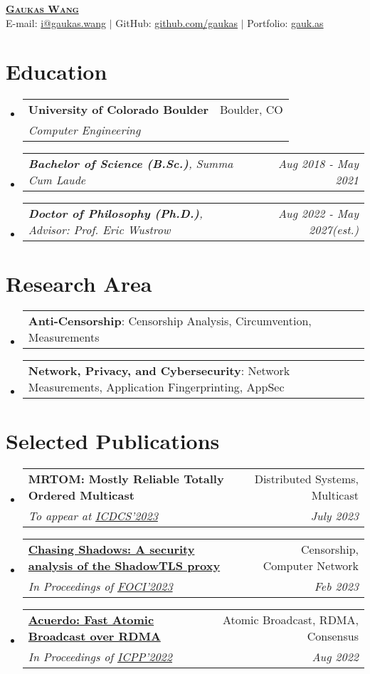 \documentclass[letterpaper,11pt]{article}
\makeatletter
\newcommand{\resumeSubheading}[4]{
  \vspace{-2pt}\item
    \begin{tabular*}{0.97\textwidth}[t]{l@{\extracolsep{\fill}}r}
      \textbf{#1} & #2 \\
      \textit{\small#3} & \textit{\small #4} \\
    \end{tabular*}\vspace{-7pt}
}
\newcommand{\resumeSubSubheading}[2]{
    \item
    \begin{tabular*}{0.97\textwidth}{l@{\extracolsep{\fill}}r}
      \textit{\small#1} & \textit{\small #2} \\
    \end{tabular*}\vspace{-7pt}
}
\newcommand{\resumeProjectHeading}[2]{
    \item
    \begin{tabular*}{0.97\textwidth}{l@{\extracolsep{\fill}}r}
      \small#1 & #2 \\
    \end{tabular*}\vspace{-7pt}
}
\newcommand{\resumeSubHeadingListStart}{\begin{itemize}[leftmargin=0.15in, label={}]}
\newcommand{\resumeSubHeadingListEnd}{\end{itemize}}
\makeatother
\begin{document}
\begin{center}
  \href{https://gaukas.wang}{\textbf{\Huge \scshape Gaukas Wang}} \\ \vspace{1pt}
    E-mail: \href{mailto:i@gaukas.wang}{{i@gaukas.wang}} $|$ 
    GitHub: \href{https://github.com/gaukas}{{github.com/gaukas}} $|$ 
    Portfolio: \href{https://gauk.as}{gauk.as}
\end{center}


\section{Education}
\resumeSubHeadingListStart
\resumeSubheading
{University of Colorado Boulder}{Boulder, CO}
{Computer Engineering}{}
\resumeSubSubheading
{\textbf{Bachelor of Science (B.Sc.)}, \em{Summa Cum Laude}}{Aug 2018 - May 2021}
\resumeSubSubheading
{\textbf{Doctor of Philosophy (Ph.D.)}, \em{Advisor: Prof. Eric Wustrow}}{Aug 2022 - May 2027\textit{(est.)}}
\resumeSubHeadingListEnd

\vspace{1pt}

\section{Research Area}
\resumeSubHeadingListStart

\resumeProjectHeading
{\textbf{Anti-Censorship}: Censorship Analysis, Circumvention, Measurements}{}

\resumeProjectHeading
{\textbf{Network, Privacy, and Cybersecurity}: Network Measurements, Application Fingerprinting, AppSec}{}

\resumeSubHeadingListEnd
\vspace{1pt}

\section{Selected Publications}
\resumeSubHeadingListStart
  \resumeSubheading
  {\textbf{MRTOM: Mostly Reliable Totally Ordered Multicast}}{Distributed Systems, Multicast}
  {To appear at \href{https://icdcs2023.icdcs.org/}{ICDCS'2023}}{July 2023}
  \resumeSubheading
  {\href{https://www.petsymposium.org/foci/2023/foci-2023-0002.php}{\textbf{Chasing Shadows: A security analysis of the ShadowTLS proxy}}}{Censorship, Computer Network}
  {In Proceedings of \href{https://foci.community/foci23.html}{FOCI'2023}}{Feb 2023}
  \resumeSubheading
  {\href{https://dl.acm.org/doi/abs/10.1145/3545008.3545041}{\textbf{Acuerdo: Fast Atomic Broadcast over RDMA}}}{Atomic Broadcast, RDMA, Consensus}
  {In Proceedings of \href{https://icpp22.gitlabpages.inria.fr/}{ICPP'2022}}{Aug 2022}
\resumeSubHeadingListEnd
\vspace{1pt}
\end{document}
